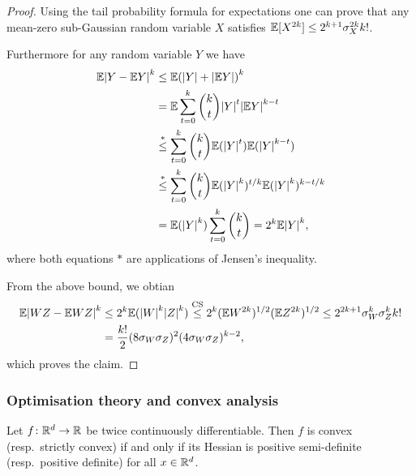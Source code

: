 \begin{proof}
	Using the tail probability formula for expectations one can prove that any mean-zero sub-Gaussian random variable $X$ satisfies $\mathbb E[X^{2k}] \leq 2^{k+1} \sigma_X^{2k} k!$. 
	
	Furthermore for any random variable $Y$ we have
	\begin{align*}
		\mathbb E\abs{Y - \mathbb E Y}^k &\leq \mathbb E\qty(\abs{Y} + \abs{\mathbb E Y})^k \\
		&= \mathbb E \sum_{t=0}^k \binom kt \abs{Y}^t \abs{\mathbb E Y}^{k-t} \\
		&\overset*\leq \sum_{t=0}^k \binom kt \mathbb E(\abs{Y}^t) \mathbb E(\abs{Y}^{k-t}) \\
		&\overset*\leq \sum_{t=0}^k \binom kt \mathbb E(\abs{Y}^k)^{t/k} \mathbb E(\abs{Y}^k)^{k - t/k} \\
		&= \mathbb E(\abs{Y}^k) \sum_{t=0}^k \binom kt = 2^k \mathbb E\abs{Y}^k,
	\end{align*}
where both equations $*$ are applications of Jensen's inequality. 

From the above bound, we obtian 
\begin{align*}
\mathbb E\abs{WZ - \mathbb E WZ}^k &\leq 2^k \mathbb E(\abs{W}^k \abs{Z}^k) \overset{\mathrm{CS}}\leq 2^k (\mathbb E W^{2k})^{1/2} (\mathbb E Z^{2k})^{1/2} \leq 2^{2k+1} \sigma_W^k \sigma_Z^k k! \\
&= \frac{k!}{2} (8\sigma_W\sigma_Z)^2 (4\sigma_W\sigma_Z)^{k-2},
\end{align*}
which proves the claim. 
\end{proof}

\subsubsection{Optimisation theory and convex analysis}
\begin{proposition}
	Let $f \colon \mathbb R^d \to \mathbb R$ be twice continuously differentiable. Then $f$ is convex (resp.\ strictly convex) if and only if its Hessian is positive semi-definite (resp.\ positive definite) for all $x \in \mathbb R^d$.
\end{proposition}